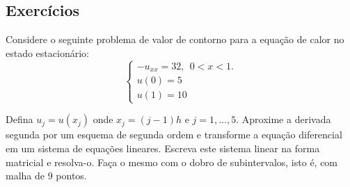 \subsection*{Exercícios}

\begin{Exercise}
 Considere o seguinte problema de valor de contorno para a equação de calor no estado estacionário:
$$\left\{\begin{array}{l}-u_{xx}=32,~~ 0<x<1.\\
u(0)=5\\
u(1)=10\end{array}
\right.
$$

Defina $u_j=u(x_j)$ onde $x_j={(j-1)}{h}$ e $j=1,\ldots,5$. Aproxime a derivada segunda por um esquema de segunda ordem e transforme a equação diferencial em um sistema de equações lineares. Escreva este sistema linear na forma matricial e resolva-o. Faça o mesmo com o dobro de subintervalos, isto é, com malha de 9 pontos. 
\end{Exercise}
